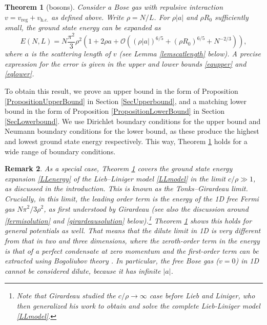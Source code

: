 \documentclass[a4paper,11pt]{article}
\newtheorem{theorem}{Theorem}
\newtheorem{remark}[theorem]{Remark}
\numberwithin{equation}{section}
\begin{document}
\begin{theorem}[bosons]
\label{TheoremMain}
Consider a Bose gas with repulsive interaction  $v=v_{\text{reg}}+v_{\text{h.c.}}$ as defined above. Write $\rho=N/L$. For $\rho|a|$ and $\rho R_0$ sufficiently small, the ground state energy can be expanded as 
\begin{equation}
\label{result}
E(N,L)=N\frac{\pi^2}{3}\rho^2\left(1+2\rho a+
\mathcal{O}
\left((\rho|a|)^{6/5}+(\rho R_0)^{6/5}+N^{-2/3}\right)\right),
\end{equation}
where $a$ is the scattering length of $v$ (see Lemma \ref{lemscatlength} below). A precise expression for the error is given in the upper and lower bounds \eqref{equpper} and \eqref{eqlower}.
\end{theorem}
To obtain this result, we prove an upper bound in the form of Proposition \ref{PropositionUpperBound} in Section \ref{SecUpperbound}, and a matching lower bound in the form of Proposition \ref{PropositionLowerBound} in Section \ref{SecLowerbound}. We use Dirichlet boundary conditions for the upper bound and Neumann boundary conditions for the lower bound, as these produce the highest and lowest ground state energy respectively. This way, Theorem \ref{TheoremMain} holds for a wide range of boundary conditions. 

\begin{remark}
\label{remfermi}
As a special case, Theorem \ref{TheoremMain} covers the ground state energy expansion \eqref{LLenergy} of the Lieb--Liniger model \eqref{LLmodel} in the limit $c/\rho\gg1$, as discussed in the introduction. This is known as the Tonks--Girardeau limit. Crucially, in this limit, the leading order term is the energy of the 1D free Fermi gas $N\pi^2/3\rho^2$, as first understood by Girardeau \cite{girardeau1960relationship} (see also the discussion around \eqref{fermisolution} and \eqref{girardeausolution} below).\footnote{Note that Girardeau studied the $c/\rho\to\infty$ case before Lieb and Liniger, who then generalized his work to obtain and solve the complete Lieb-Liniger model \eqref{LLmodel}.} Theorem \ref{TheoremMain} shows this holds for general potentials as well. That means that the dilute limit in 1D is very different from that in two and three dimensions, where the zeroth-order term in the energy is that of a perfect condensate at zero momentum and the first-order term can be extracted using Bogoliubov theory \cite{bogoliubov1947theory}. In particular, the free Bose gas ($v=0$) in 1D cannot be considered dilute, because it has infinite $|a|$.  
\end{remark}
\end{document}
